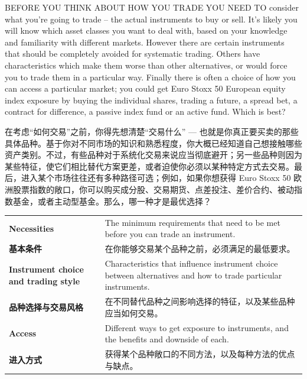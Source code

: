 
\begin{englishblock} BEFORE YOU THINK ABOUT HOW YOU TRADE YOU NEED TO consider what you're going to trade -- the actual instruments to buy or sell. It's likely you will know which asset classes you want to deal with, based on your knowledge and familiarity with different markets. However there are certain instruments that should be completely avoided for systematic trading. Others have characteristics which make them worse than other alternatives, or would force you to trade them in a particular way. Finally there is often a choice of how you can access a particular market; you could get Euro Stoxx 50 European equity index exposure by buying the individual shares, trading a future, a spread bet, a contract for difference, a passive index fund or an active fund. Which is best? \end{englishblock}

\begin{chineseblock}在考虑“如何交易”之前，你得先想清楚“交易什么” --- 也就是你真正要买卖的那些具体品种。基于你对不同市场的知识和熟悉程度，你大概已经知道自己想接触哪些资产类别。不过，有些品种对于系统化交易来说应当彻底避开；另一些品种则因为某些特征，使它们相比替代方案更差，或者迫使你必须以某种特定方式去交易。最后，进入某个市场往往还有多种路径可选；例如，如果你想获得 Euro Stoxx 50 欧洲股票指数的敞口，你可以购买成分股、交易期货、点差投注、差价合约、被动指数基金，或者主动型基金。那么，哪一种才是最优选择？\end{chineseblock}


\begin{bilingualtableblock} \begin{tabularx}{\textwidth}{@{} L{0.30\textwidth} Y@{}}\textbf{Necessities} & The minimum requirements that need to be met before you can trade an instrument. \\

\textbf{基本条件} & 在你能够交易某个品种之前，必须满足的最低要求。 \\
\textbf{Instrument choice and trading style} & Characteristics that influence instrument choice between alternatives and how to trade particular instruments. \\
\textbf{品种选择与交易风格} & 在不同替代品种之间影响选择的特征，以及某些品种应当如何交易。 \\
\textbf{Access} & Different ways to get exposure to instruments, and the benefits and downside of each. \\
\textbf{进入方式} & 获得某个品种敞口的不同方法，以及每种方法的优点与缺点。 \\
\end{tabularx}
\end{bilingualtableblock}

